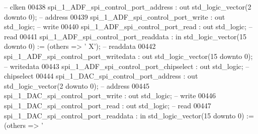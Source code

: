 \begin{DoxyCode}
           \textcolor{keyword}{-- clken}
00438             spi\_1\_ADF\_spi\_control\_port\_address          : \textcolor{keywordflow}{out} \textcolor{comment}{std\_logic\_vector}(\textcolor{vhdllogic}{}\textcolor{vhdllogic}{2} \textcolor{keywordflow}{downto} \textcolor{vhdllogic}{}\textcolor{vhdllogic}{0});                
           \textcolor{keyword}{-- address}
00439             spi\_1\_ADF\_spi\_control\_port\_write            : \textcolor{keywordflow}{out} \textcolor{comment}{std\_logic};                                   
           \textcolor{keyword}{-- write}
00440             spi\_1\_ADF\_spi\_control\_port\_read             : \textcolor{keywordflow}{out} \textcolor{comment}{std\_logic};                                   
           \textcolor{keyword}{-- read}
00441             spi\_1\_ADF\_spi\_control\_port\_readdata         : \textcolor{keywordflow}{in}  \textcolor{comment}{std\_logic\_vector}(\textcolor{vhdllogic}{}\textcolor{vhdllogic}{15} \textcolor{keywordflow}{downto} \textcolor{vhdllogic}{}\textcolor{vhdllogic}{0}) := (\textcolor{keywordflow}{others} => '
      X'); \textcolor{keyword}{-- readdata}
00442             spi\_1\_ADF\_spi\_control\_port\_writedata        : \textcolor{keywordflow}{out} \textcolor{comment}{std\_logic\_vector}(\textcolor{vhdllogic}{}\textcolor{vhdllogic}{15} \textcolor{keywordflow}{downto} \textcolor{vhdllogic}{}\textcolor{vhdllogic}{0});               
           \textcolor{keyword}{-- writedata}
00443             spi\_1\_ADF\_spi\_control\_port\_chipselect       : \textcolor{keywordflow}{out} \textcolor{comment}{std\_logic};                                   
           \textcolor{keyword}{-- chipselect}
00444             spi\_1\_DAC\_spi\_control\_port\_address          : \textcolor{keywordflow}{out} \textcolor{comment}{std\_logic\_vector}(\textcolor{vhdllogic}{}\textcolor{vhdllogic}{2} \textcolor{keywordflow}{downto} \textcolor{vhdllogic}{}\textcolor{vhdllogic}{0});                
           \textcolor{keyword}{-- address}
00445             spi\_1\_DAC\_spi\_control\_port\_write            : \textcolor{keywordflow}{out} \textcolor{comment}{std\_logic};                                   
           \textcolor{keyword}{-- write}
00446             spi\_1\_DAC\_spi\_control\_port\_read             : \textcolor{keywordflow}{out} \textcolor{comment}{std\_logic};                                   
           \textcolor{keyword}{-- read}
00447             spi\_1\_DAC\_spi\_control\_port\_readdata         : \textcolor{keywordflow}{in}  \textcolor{comment}{std\_logic\_vector}(\textcolor{vhdllogic}{}\textcolor{vhdllogic}{15} \textcolor{keywordflow}{downto} \textcolor{vhdllogic}{}\textcolor{vhdllogic}{0}) := (\textcolor{keywordflow}{others} => '

\end{DoxyCode}
